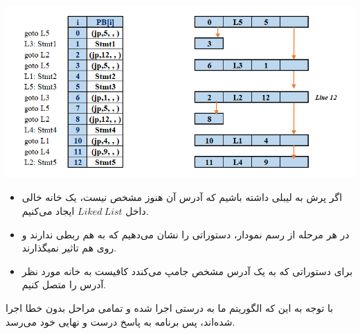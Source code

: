 \qquad\qquad\qquad\includegraphics[width=0.7\linewidth]{figs/55.png}


\begin{itemize}
	\item 
	اگر پرش به لیبلی داشته باشیم که آدرس آن هنوز مشخص نیست، یک خانه خالی داخل 
	$Liked \ List$
	ایجاد می‌کنیم.
	\item 
	در هر مرحله از رسم نمودار، دستوراتی را نشان می‌دهیم که به هم ربطی ندارند و روی هم تاثیر نمیگذارند.
	\item 
	برای دستوراتی که به یک آدرس مشخص جامپ می‌کندد کافیست به خانه مورد نظر آدرس را متصل کنیم.
	
\end{itemize}




با توجه به این که الگوریتم ما به درستی اجرا شده و تمامی مراحل بدون خطا اجرا شده‌اند، پس برنامه به پاسخ درست و نهایی خود می‌رسد.



















